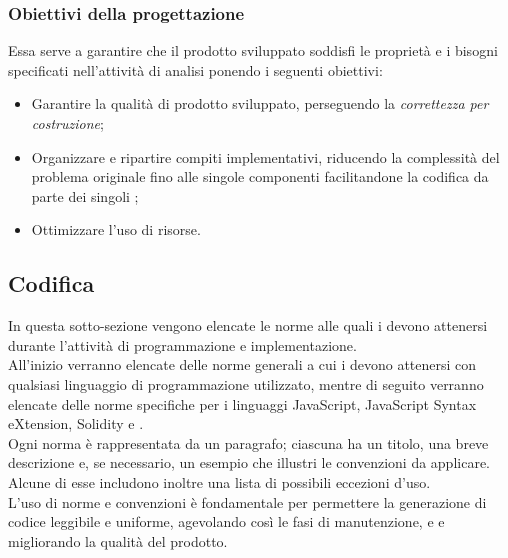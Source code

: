 \documentclass[NormeDiProgetto.tex]{subfiles}
\begin{document}
\subsubsection{Obiettivi della progettazione}
Essa serve a garantire che il prodotto sviluppato soddisfi le proprietà e i bisogni specificati nell'attività di analisi ponendo i seguenti obiettivi:
\begin{itemize}
	\item Garantire la qualità di prodotto sviluppato, perseguendo la \textit{correttezza
		per costruzione};
	\item Organizzare e ripartire compiti implementativi, riducendo la
	complessità del problema originale fino alle singole componenti
	facilitandone la codifica da parte dei singoli \progri{};
	\item Ottimizzare l’uso di risorse.
\end{itemize}

\subsection{Codifica}
In questa sotto-sezione vengono elencate le norme alle quali i \progri{} devono attenersi durante l'attività di programmazione e implementazione.\\
All'inizio verranno elencate delle norme generali a cui i \progri{} devono attenersi con qualsiasi linguaggio di programmazione utilizzato, mentre di seguito verranno elencate delle norme specifiche per i linguaggi JavaScript, JavaScript Syntax eXtension, Solidity e .\\
Ogni norma è rappresentata da un paragrafo; ciascuna ha un titolo, una breve descrizione e, se necessario, un esempio che illustri le convenzioni da applicare. Alcune di esse includono inoltre una lista di possibili eccezioni d'uso.\\
L'uso di norme e convenzioni è fondamentale per permettere la generazione di codice leggibile e uniforme, agevolando così le fasi di manutenzione,  e  e migliorando la qualità del prodotto.
\end{document}
